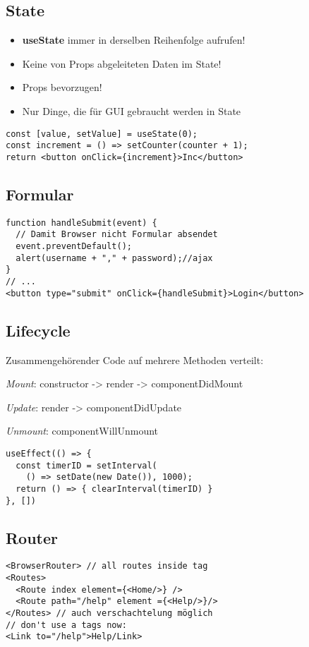 \begin{multicols*}{2}
\subsection{State}
\begin{itemize}
    \item \textbf{useState} immer in derselben Reihenfolge aufrufen!
    \item Keine von Props abgeleiteten Daten im State!
    \item Props bevorzugen!
    \item Nur Dinge, die für GUI gebraucht werden in State
\end{itemize}

\begin{verbatim}
const [value, setValue] = useState(0);
const increment = () => setCounter(counter + 1);
return <button onClick={increment}>Inc</button>
\end{verbatim}

\subsection{Formular}
\begin{verbatim}
function handleSubmit(event) {
  // Damit Browser nicht Formular absendet
  event.preventDefault();
  alert(username + "," + password);//ajax
}
// ...
<button type="submit" onClick={handleSubmit}>Login</button>
\end{verbatim}

\subsection{Lifecycle}
Zusammengehörender Code auf mehrere Methoden verteilt:

\textit{Mount}: constructor -> render -> componentDidMount

\textit{Update}: render -> componentDidUpdate

\textit{Unmount}: componentWillUnmount

\begin{verbatim}
useEffect(() => {
  const timerID = setInterval(
    () => setDate(new Date()), 1000);
  return () => { clearInterval(timerID) }
}, [])
\end{verbatim}

\subsection{Router}
\begin{verbatim}
<BrowserRouter> // all routes inside tag
<Routes>
  <Route index element={<Home/>} />
  <Route path="/help" element ={<Help/>}/>
</Routes> // auch verschachtelung möglich
// don't use a tags now:
<Link to="/help">Help/Link>
\end{verbatim}


\end{multicols*}
